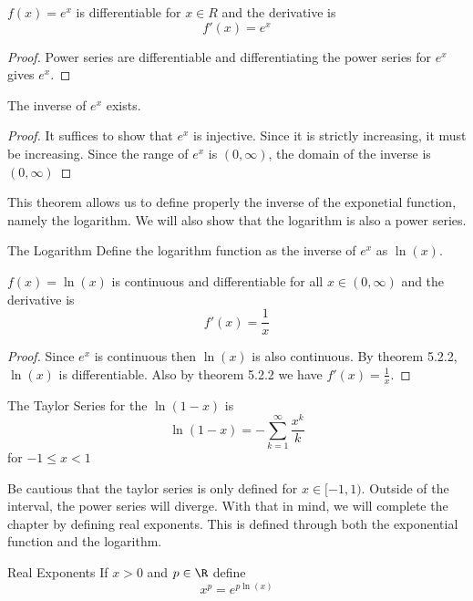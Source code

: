 \begin{thm}{}{} $f(x)=e^x$ is differentiable for $x\in R$ and the derivative is $$f'(x)=e^x$$ \tcbline
\begin{proof} Power series are differentiable and differentiating the power series for $e^x$ gives $e^x$. 
\end{proof}
\end{thm}

\begin{thm}{}{} The inverse of $e^x$ exists. \tcbline
\begin{proof} It suffices to show that $e^x$ is injective. Since it is strictly increasing, it must be increasing. Since the range of $e^x$ is $(0,\infty)$, the domain of the inverse is $(0,\infty)$
\end{proof}
\end{thm}

This theorem allows us to define properly the inverse of the exponetial function, namely the logarithm. We will also show that the logarithm is also a power series. 

\begin{defn}{The Logarithm}{} Define the logarithm function as the inverse of $e^x$ as $\ln(x)$. 
\end{defn}

\begin{thm}{}{} $f(x)=\ln(x)$ is continuous and differentiable for all $x\in(0,\infty)$ and the derivative is $$f'(x)=\frac{1}{x}$$ \tcbline
\begin{proof} Since $e^x$ is continuous then $\ln(x)$ is also continuous. By theorem 5.2.2, $\ln(x)$ is differentiable. Also by theorem 5.2.2 we have $f'(x)=\frac{1}{x}$. 
\end{proof}
\end{thm}

\begin{thm}{}{} The Taylor Series for the $\ln(1-x)$ is $$\ln(1-x)=-\sum_{k=1}^\infty\frac{x^k}{k}$$ for $-1\leq x<1$
\end{thm}

Be cautious that the taylor series is only defined for $x\in[-1,1)$. Outside of the interval, the power series will diverge. With that in mind, we will complete the chapter by defining real exponents. This is defined through both the exponential function and the logarithm. 

\begin{defn}{Real Exponents}{} If $x>0$ and $p\in\R$ define $$x^p=e^{p\ln(x)}$$
\end{defn}

